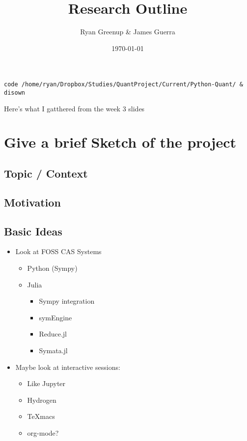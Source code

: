 \documentclass[11pt]{article}
\author{Ryan Greenup \& James Guerra}
\date{\today}
\title{Research Outline}
\begin{document}
\maketitle
\tableofcontents

\begin{verbatim}
code /home/ryan/Dropbox/Studies/QuantProject/Current/Python-Quant/ & disown
\end{verbatim}

Here's what I gatthered from the week 3 slides

\section{Give a brief Sketch of the project}
\label{sec:orgce8eada}

\subsection{Topic / Context}
\label{sec:org587bcb4}

\subsection{Motivation}
\label{sec:org84dfa04}

\subsection{Basic Ideas}
\label{sec:orgd98c738}
\begin{itemize}
\item Look at FOSS CAS Systems
\begin{itemize}
\item Python (Sympy)
\item Julia
\begin{itemize}
\item Sympy integration
\item symEngine
\item Reduce.jl
\item Symata.jl
\end{itemize}
\end{itemize}

\item Maybe look at interactive sessions:
\begin{itemize}
\item Like Jupyter
\item Hydrogen
\item TeXmacs
\item org-mode?
\end{itemize}
\end{itemize}
\end{document}
